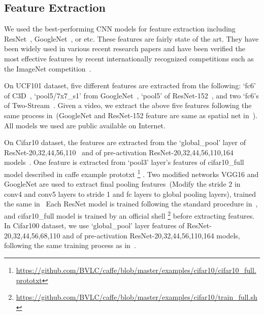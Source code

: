 \documentclass[10pt,twocolumn,letterpaper]{article}
\begin{document}
\subsection{Feature Extraction}
We used the best-performing CNN models for feature extraction including ResNet~\cite{he2015deep}, GoogleNet~\cite{szegedy2015going}, or etc.
These features are fairly state of the art.
They have been widely used in various recent research papers and have been verified the most effective features by recent internationally recognized competitions such as the ImageNet competition~\cite{russakovsky2015imagenet}.

On UCF101 dataset, five different features are extracted from the following:
`fc6' of C3D~\cite{tran2015learning},
`pool5/7x7\_s1' from GoogleNet~\cite{szegedy2015going},
`pool5' of ResNet-152~\cite{he2015deep},
and two `fc6's of Two-Stream~\cite{simonyan2014two}.
Given a video, we extract the above five features following the same process in~\cite{simonyan2014two,tran2015learning}(GoogleNet and ResNet-152 feature are same as spatial net in~\cite{simonyan2014two}).
All models we used are public available on Internet. %

On Cifar10 dataset, the features are extracted from the `global\_pool' layer of ResNet-20,32,44,56,110~\cite{he2015deep} and of pre-activation ResNet-20,32,44,56,110,164 models~\cite{he2016identity}.
One feature is extracted from `pool3' layer's features of cifar10\_full model described in caffe example prototxt
\footnote{\url{https://github.com/BVLC/caffe/blob/master/examples/cifar10/cifar10_full.prototxt}}
.
Two modified networks VGG16 and GoogleNet are used to extract final pooling features~(Modify the stride 2 in conv4 and conv5 layers to stride 1 and fc layers to global pooling layers), trained the same in~\cite{he2015deep}
Each ResNet model is trained following the standard procedure in~\cite{he2015deep,he2016identity}, and cifar10\_full model is trained by an official shell
\footnote{\url{https://github.com/BVLC/caffe/blob/master/examples/cifar10/train_full.sh}}
before extracting features.
In Cifar100 dataset, we use `global\_pool' layer features of ResNet-20,32,44,56,68,110 and of pre-activation ResNet-20,32,44,56,110,164 models, following the same training process as in~\cite{he2015deep,he2016identity}.
\end{document}
